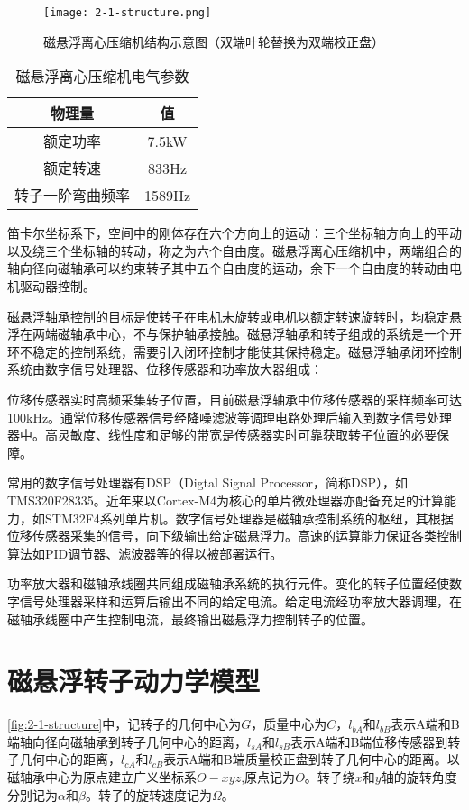 \documentclass[
  lang=cn,
  degree=master,
  openany,oneside
]{nuaathesis}
\begin{document}
\begin{figure}[h!]
	\texttt{[image: 2-1-structure.png]}
	\caption{磁悬浮离心压缩机结构示意图（双端叶轮替换为双端校正盘）}
	\label{fig:2-1-structure}
\end{figure}

\begin{table}[h!]
  \caption[磁悬浮离心压缩机电气参数]{磁悬浮离心压缩机电气参数\label{tab:motor_para}}
  \begin{tabular}{cc}
    \toprule
    物理量 & 值 \\
    \midrule
    额定功率 & 7.5kW\\
    额定转速 & 833Hz\\
    转子一阶弯曲频率 & 1589Hz\\
    \bottomrule
  \end{tabular}
\end{table}

笛卡尔坐标系下，空间中的刚体存在六个方向上的运动：三个坐标轴方向上的平动以及绕三个坐标轴的转动，称之为六个自由度。磁悬浮离心压缩机中，两端组合的轴向径向磁轴承可以约束转子其中五个自由度的运动，余下一个自由度的转动由电机驱动器控制。

磁悬浮轴承控制的目标是使转子在电机未旋转或电机以额定转速旋转时，均稳定悬浮在两端磁轴承中心，不与保护轴承接触。磁悬浮轴承和转子组成的系统是一个开环不稳定的控制系统，需要引入闭环控制才能使其保持稳定。磁悬浮轴承闭环控制系统由数字信号处理器、位移传感器和功率放大器组成：

位移传感器实时高频采集转子位置，目前磁悬浮轴承中位移传感器的采样频率可达100kHz。通常位移传感器信号经降噪滤波等调理电路处理后输入到数字信号处理器中。高灵敏度、线性度和足够的带宽是传感器实时可靠获取转子位置的必要保障。

常用的数字信号处理器有DSP（Digtal Signal Processor，简称DSP），如TMS320F28335。近年来以Cortex-M4为核心的单片微处理器亦配备充足的计算能力，如STM32F4系列单片机。数字信号处理器是磁轴承控制系统的枢纽，其根据位移传感器采集的信号，向下级输出给定磁悬浮力。高速的运算能力保证各类控制算法如PID调节器、滤波器等的得以被部署运行。

功率放大器和磁轴承线圈共同组成磁轴承系统的执行元件。变化的转子位置经使数字信号处理器采样和运算后输出不同的给定电流。给定电流经功率放大器调理，在磁轴承线圈中产生控制电流，最终输出磁悬浮力控制转子的位置。

\section{磁悬浮转子动力学模型}
\autoref{fig:2-1-structure}中，记转子的几何中心为$ G $，质量中心为$ C $，$ l_{bA} $和$ l_{bB} $表示A端和B端轴向径向磁轴承到转子几何中心的距离，$ l_{sA} $和$ l_{sB} $表示A端和B端位移传感器到转子几何中心的距离，$ l_{cA} $和$ l_{cB} $表示A端和B端质量校正盘到转子几何中心的距离。以磁轴承中心为原点建立广义坐标系$ O-xyz $,原点记为$ O $。转子绕$ x $和$ y $轴的旋转角度分别记为$ \alpha $和$ \beta $。转子的旋转速度记为$ \Omega $。
\end{document}
